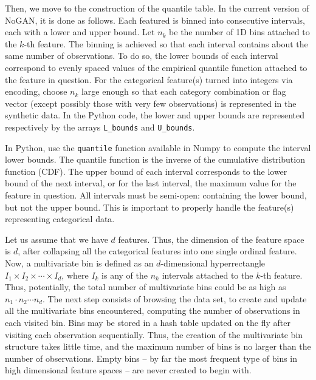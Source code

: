 \documentclass[oneside,10pt]{book}
\begin{document}
\noindent Then, we move to the construction of the \textcolor{index}{quantile} table. In the current version of NoGAN, it is done as follows. Each featured is binned into consecutive intervals, each with a lower and upper bound. Let $n_k$ be the number of 1D bins attached to the $k$-th feature. The binning is achieved so that each interval contains about the same number of observations. To do so, the lower bounds of each interval correspond to evenly spaced values of the empirical \textcolor{index}{quantile function} attached to the feature in question. For the categorical feature(s) turned into integers via encoding, choose $n_k$ large enough so that each category combination or flag vector (except
 possibly those with very few observations) is represented in the synthetic data. In the Python code, the lower and upper bounds are
 represented respectively by the arrays \texttt{L\_bounds} and \texttt{U\_bounds}.

In Python,
 use the  \texttt{quantile} function available in Numpy to compute the interval lower bounds. The quantile function  is the inverse of the cumulative distribution function (CDF). The upper bound of each interval corresponds to the lower bound of the next interval, or for the last interval, the maximum value for the feature in question. All intervals must be semi-open: containing the lower bound, but not the upper bound. This is important to properly handle the feature(s) representing categorical data.

Let us assume that we have $d$ features. Thus, the dimension of the feature space is $d$, after collapsing all the categorical features into one single ordinal feature. Now, a multivariate bin is defined as an $d$-dimensional hyperrectangle
$I_1 \times I_2 \times \cdots\times I_d$, where $I_k$ is any of the $n_k$ intervals attached to the $k$-th feature.
 Thus, potentially, the total number of multivariate bins could be as high as $n_1\cdot n_2 \cdots  n_d$. The next step consists of browsing the data set,
 to create and update all the multivariate bins encountered, computing the number of observations in each visited bin.
 Bins may be stored in a hash table updated on the fly after visiting each observation sequentially. Thus, the creation of the
multivariate  bin structure takes
 little time, and the maximum number of bins is no larger than the number of observations. Empty bins -- by far the most frequent type of bins in
  high dimensional feature spaces -- are never created to begin with.
\end{document}
